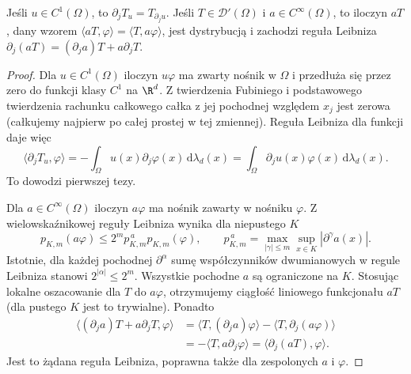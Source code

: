 \begin{stwierdzenie}
\label{prop:pde7-classical}
Jeśli $u\in C^1(\Omega)$, to $\partial_jT_u=T_{\partial_j u}$.
Jeśli $T\in\mathcal D'(\Omega)$ i $a\in C^\infty(\Omega)$,
to iloczyn $aT$, dany wzorem
$\langle aT,\varphi\rangle=\langle T,a\varphi\rangle$,
jest dystrybucją i zachodzi reguła Leibniza
$\partial_j(aT)=(\partial_ja)T+a\partial_jT$.
\end{stwierdzenie}
\begin{proof}
Dla $u\in C^1(\Omega)$ iloczyn $u\varphi$ ma zwarty
nośnik w $\Omega$ i przedłuża się przez zero do
funkcji klasy $C^1$ na $\R^d$. Z twierdzenia Fubiniego
i podstawowego twierdzenia rachunku całkowego
całka z jej pochodnej względem $x_j$ jest zerowa
(całkujemy najpierw po całej prostej w tej zmiennej).
Reguła Leibniza dla funkcji daje więc
\[
 \langle\partial_jT_u,\varphi\rangle
 =-\int_\Omega u(x)\partial_j\varphi(x)\,\mathrm d\lambda_d(x)
 =\int_\Omega \partial_ju(x)\varphi(x)\,\mathrm d\lambda_d(x).
\]
To dowodzi pierwszej tezy.

Dla $a\in C^\infty(\Omega)$ iloczyn $a\varphi$ ma
nośnik zawarty w nośniku $\varphi$. Z wielowskaźnikowej
reguły Leibniza wynika dla niepustego $K$
\[
 p_{K,m}(a\varphi)\le 2^m p_{K,m}^{\,a}p_{K,m}(\varphi),
 \qquad
 p_{K,m}^{\,a}=\max_{|\gamma|\le m}
 \sup_{x\in K}|\partial^\gamma a(x)|.
\]
Istotnie, dla każdej pochodnej $\partial^\alpha$
sumę współczynników dwumianowych w regule Leibniza
stanowi $2^{|\alpha|}\le2^m$. Wszystkie pochodne
$a$ są ograniczone na $K$. Stosując lokalne oszacowanie
dla $T$ do $a\varphi$, otrzymujemy ciągłość liniowego
funkcjonału $aT$ (dla pustego $K$ jest to trywialne).
Ponadto
\[
 \begin{aligned}
 \langle(\partial_ja)T+a\partial_jT,\varphi\rangle
 &=\langle T,(\partial_ja)\varphi\rangle
   -\langle T,\partial_j(a\varphi)\rangle\\
 &=-\langle T,a\partial_j\varphi\rangle
 =\langle\partial_j(aT),\varphi\rangle.
 \end{aligned}
\]
Jest to żądana reguła Leibniza, poprawna także
dla zespolonych $a$ i $\varphi$.
\end{proof}

